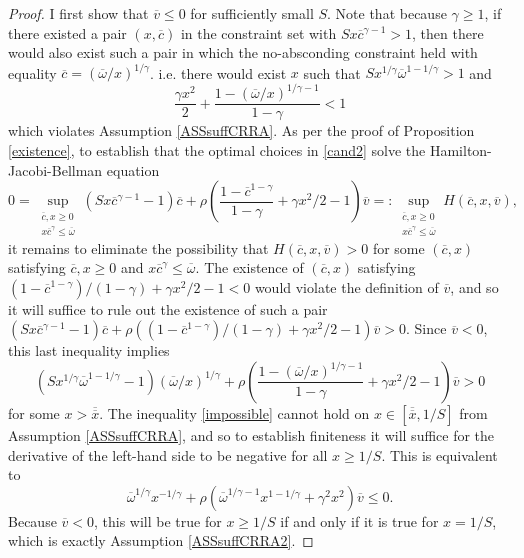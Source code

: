 \documentclass[11pt]{article}
\theoremstyle{plain}
\theoremstyle{definition} %
\begin{document}
\begin{proof}
I first show that $\overline{v} \leq 0$ for sufficiently small $S$. Note that because $\gamma \geq 1$, if there existed a pair $(x, \overline{c})$ in the constraint set with $Sx\overline{c}^{\gamma-1} > 1$, then there would also exist such a pair in which the no-absconding constraint held with equality $\overline{c} = (\overline{\omega}/x)^{1/\gamma}$. i.e. there would exist $x$ such that $Sx^{1/\gamma}\overline{\omega}^{1-1/\gamma} > 1$ and 
$$
\frac{\gamma x^2}{2} + \frac{1 - (\overline{\omega}/x)^{1/\gamma-1}}{1-\gamma} < 1
$$
which violates Assumption \ref{ASSsuffCRRA}. As per the proof of Proposition \ref{existence}, to establish that the optimal choices in \eqref{cand2} solve the Hamilton-Jacobi-Bellman equation
$$
0 = \sup_{\substack{\overline{c},x\geq 0 \\ x\overline{c}^{\gamma} \leq \overline{\omega}}} (Sx\overline{c}^{\gamma-1} - 1)\overline{c} + \rho{\left(\frac{1 - \overline{c}^{1-\gamma}}{1-\gamma} + \gamma x^2/2 - 1\right)}\overline{v} =: \sup_{\substack{\overline{c},x\geq 0 \\ x\overline{c}^{\gamma} \leq \overline{\omega}}} H(\overline{c}, x, \overline{v}),
$$
it remains to eliminate the possibility that $H(\overline{c}, x, \overline{v}) > 0$ for some $(\overline{c}, x)$ satisfying $\overline{c},x\geq 0$ and $x\overline{c}^{\gamma} \leq \overline{\omega}$. The existence of $(\overline{c}, x)$ satisfying $(1 - \overline{c}^{1-\gamma})/(1-\gamma) + \gamma x^2/2- 1 < 0$ would violate the definition of $\overline{v}$, and so it will suffice to rule out the existence of such a pair $(Sx\overline{c}^{\gamma-1} - 1)\overline{c} + \rho((1 - \overline{c}^{1-\gamma})/(1-\gamma) + \gamma x^2/2 - 1)\overline{v} > 0$. Since $\overline{v} < 0$, this last inequality implies %
\begin{equation} %
(Sx^{1/\gamma}\overline{\omega}^{1-1/\gamma} - 1)(\overline{\omega}/x)^{1/\gamma} + \rho{\left(\frac{1 - (\overline{\omega}/x)^{1/\gamma-1}}{1-\gamma} + \gamma x^2/2 - 1\right)}\overline{v} > 0
\label{impossible}
\end{equation}
for some $x > \overline{\overline{x}}$. The inequality \eqref{impossible} cannot hold on $x \in [\overline{\overline{x}}, 1/S]$ from Assumption \ref{ASSsuffCRRA}, and so to establish finiteness it will suffice for the derivative of the left-hand side to be negative for all $x \geq 1/S$. This is equivalent to 
$$
\overline{\omega}^{1/\gamma}x^{-1/\gamma} + \rho{\left(\overline{\omega}^{1/\gamma-1}x^{1-1/\gamma} + \gamma^2 x^2\right)}\overline{v} \leq 0.
$$
Because $\overline{v}<0$, this will be true for $x \geq 1/S$ if and only if it is true for $x=1/S$, which is exactly Assumption \ref{ASSsuffCRRA2}. 


\end{proof}
\end{document}

